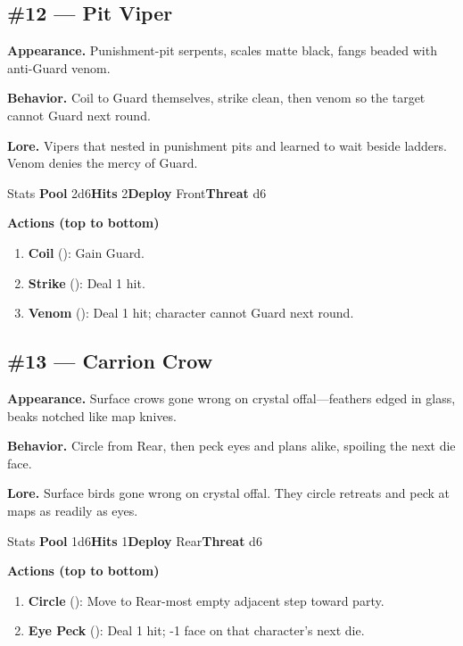 \subsection*{\#12 --- Pit Viper}

\textbf{Appearance.} Punishment-pit serpents, scales matte black, fangs beaded with anti-Guard venom.

\textbf{Behavior.} Coil to Guard themselves, strike clean, then venom so the target cannot Guard next round.

\textbf{Lore.} Vipers that nested in punishment pits and learned to wait beside ladders. Venom denies the mercy of Guard.

\begin{monsterentry}{Stats}
\textbf{Pool} 2d6\quad\textbf{Hits} 2\quad\textbf{Deploy} Front\quad\textbf{Threat} d6

\textbf{Actions (top to bottom)}
\begin{enumerate}\setlength{\itemsep}{0.15em}\setlength{\parskip}{0pt}
  \item \textbf{Coil} (\easy): Gain Guard.
  \item \textbf{Strike} (\medium): Deal 1 hit.
  \item \textbf{Venom} (\hard): Deal 1 hit; character cannot Guard next round.
\end{enumerate}
\end{monsterentry}

\subsection*{\#13 --- Carrion Crow}

\textbf{Appearance.} Surface crows gone wrong on crystal offal---feathers edged in glass, beaks notched like map knives.

\textbf{Behavior.} Circle from Rear, then peck eyes and plans alike, spoiling the next die face.

\textbf{Lore.} Surface birds gone wrong on crystal offal. They circle retreats and peck at maps as readily as eyes.

\begin{monsterentry}{Stats}
\textbf{Pool} 1d6\quad\textbf{Hits} 1\quad\textbf{Deploy} Rear\quad\textbf{Threat} d6

\textbf{Actions (top to bottom)}
\begin{enumerate}\setlength{\itemsep}{0.15em}\setlength{\parskip}{0pt}
  \item \textbf{Circle} (\easy): Move to Rear-most empty adjacent step toward party.
  \item \textbf{Eye Peck} (\medium): Deal 1 hit; -1 face on that character's next die.
\end{enumerate}
\end{monsterentry}

